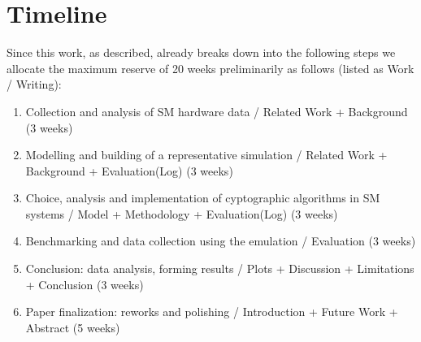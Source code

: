 \documentclass[english]{tudscrartcl}
\begin{document}
	\section{Timeline}
	\normalsize
	Since this work, as described, already breaks down into the following steps we allocate the maximum reserve of 20 weeks preliminarily as follows (listed as Work / Writing):
	\begin{enumerate}
		\item Collection and analysis of SM hardware data / Related Work + Background (3 weeks)
		\item Modelling and building of a representative simulation / Related Work + Background + Evaluation(Log) (3 weeks)
		\item Choice, analysis and implementation of cyptographic algorithms in SM systems / Model + Methodology + Evaluation(Log) (3 weeks)
		\item Benchmarking and data collection using the emulation / Evaluation (3 weeks)
		\item Conclusion: data analysis, forming results / Plots + Discussion + Limitations + Conclusion (3 weeks)
		\item Paper finalization: reworks and polishing / Introduction + Future Work + Abstract (5 weeks)
	\end{enumerate}
	
	
	
\end{document}
